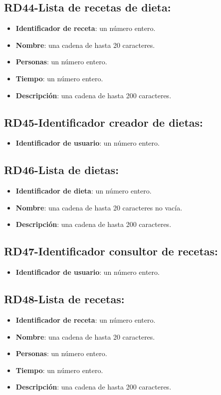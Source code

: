 \documentclass[a4paper,12pt]{report}
\begin{document}
\subsection{RD44-Lista de recetas de dieta:}
\label{sec-2-1-44}
\begin{itemize}
\item \textbf{Identificador de receta}: un número entero.
\item \textbf{Nombre}: una cadena de hasta 20 caracteres.
\item \textbf{Personas}: un número entero.
\item \textbf{Tiempo}: un número entero.
\item \textbf{Descripción}: una cadena de hasta 200 caracteres.
\end{itemize}
\subsection{RD45-Identificador creador de dietas:}
\label{sec-2-1-45}
\begin{itemize}
\item \textbf{Identificador de usuario}: un número entero.
\end{itemize}
\subsection{RD46-Lista de dietas:}
\label{sec-2-1-46}
\begin{itemize}
\item \textbf{Identificador de dieta}: un número entero.
\item \textbf{Nombre}: una cadena de hasta 20 caracteres no vacía.
\item \textbf{Descripción}: una cadena de hasta 200 caracteres.
\end{itemize}
\subsection{RD47-Identificador consultor de recetas:}
\label{sec-2-1-47}
\begin{itemize}
\item \textbf{Identificador de usuario}: un número entero.
\end{itemize}
\subsection{RD48-Lista de recetas:}
\label{sec-2-1-48}
\begin{itemize}
\item \textbf{Identificador de receta}: un número entero.
\item \textbf{Nombre}: una cadena de hasta 20 caracteres.
\item \textbf{Personas}: un número entero.
\item \textbf{Tiempo}: un número entero.
\item \textbf{Descripción}: una cadena de hasta 200 caracteres.
\end{itemize}
\end{document}
